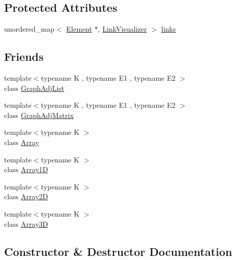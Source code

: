 \subsection*{Protected Attributes}
\begin{DoxyCompactItemize}
\item 
unordered\+\_\+map$<$ \hyperlink{classbridges_1_1datastructure_1_1_element}{Element} $\ast$, \hyperlink{classbridges_1_1datastructure_1_1_link_visualizer}{Link\+Visualizer} $>$ \hyperlink{classbridges_1_1datastructure_1_1_element_ac296ae66e6b04e95f31f4134228524f8}{links}
\end{DoxyCompactItemize}
\subsection*{Friends}
\begin{DoxyCompactItemize}
\item 
{\footnotesize template$<$typename K , typename E1 , typename E2 $>$ }\\class \hyperlink{classbridges_1_1datastructure_1_1_element_a65850138f0763fec43a76fb942f0eccc}{Graph\+Adj\+List}
\item 
{\footnotesize template$<$typename K , typename E1 , typename E2 $>$ }\\class \hyperlink{classbridges_1_1datastructure_1_1_element_a1935808473b7eb8ff54149c5436c3ac9}{Graph\+Adj\+Matrix}
\item 
{\footnotesize template$<$typename K $>$ }\\class \hyperlink{classbridges_1_1datastructure_1_1_element_ab1a595168ea1870ce436dfd2d8e69b6d}{Array}
\item 
{\footnotesize template$<$typename K $>$ }\\class \hyperlink{classbridges_1_1datastructure_1_1_element_a71a2fa1cdcc1e193c1790c39b8267780}{Array1D}
\item 
{\footnotesize template$<$typename K $>$ }\\class \hyperlink{classbridges_1_1datastructure_1_1_element_a335c96c00a46d6b064b5af268ae03e42}{Array2D}
\item 
{\footnotesize template$<$typename K $>$ }\\class \hyperlink{classbridges_1_1datastructure_1_1_element_a2adb97d98cc3a6fe0cd1daaf40058938}{Array3D}
\end{DoxyCompactItemize}


\subsection{Constructor \& Destructor Documentation}
\mbox{\label{classbridges_1_1datastructure_1_1_element_a21820b1d88f2eb25adfe768bd03046d6}} 
